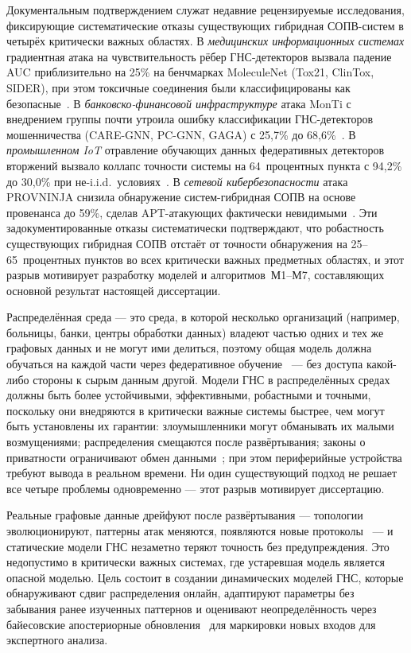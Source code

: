 Документальным подтверждением служат недавние рецензируемые
исследования, фиксирующие систематические отказы существующих
гибридная СОПВ-систем в четырёх критически важных областях. В
\emph{медицинских информационных системах} градиентная атака на
чувствительность рёбер ГНС-детекторов вызвала падение AUC
приблизительно на 25\% на бенчмарках MoleculeNet (Tox21, ClinTox,
SIDER), при этом токсичные соединения были классифицированы как
безопасные~\cite{EdgeSensitivity2025}. В \emph{банковско-финансовой
инфраструктуре} атака MonTi с внедрением группы почти утроила
ошибку классификации ГНС-детекторов мошенничества (CARE-GNN,
PC-GNN, GAGA) с 25{,}7\% до
68{,}6\%~\cite{MonTi2025}. В \emph{промышленном IoT} отравление
обучающих данных федеративных детекторов вторжений вызвало коллапс
точности системы на 64~процентных пункта с 94{,}2\% до 30{,}0\% при
не-i.i.d.\ условиях~\cite{FerragPoisoning2023}. В \emph{сетевой
кибербезопасности} атака PROVNINJA снизила обнаружение
систем-гибридная СОПВ на основе провенанса до 59\%, сделав
APT-атакующих фактически
невидимыми~\cite{PROVNINJA2023}. Эти задокументированные отказы
систематически подтверждают, что робастность существующих
гибридная СОПВ отстаёт от точности обнаружения на 25--65~процентных
пунктов во всех критически важных предметных областях, и этот
разрыв мотивирует разработку моделей и алгоритмов~М1--М7,
составляющих основной результат настоящей диссертации.

Распределённая среда --- это среда, в которой несколько организаций (например, больницы, банки, центры обработки данных) владеют частью одних и тех же графовых данных и не могут ими делиться, поэтому общая модель должна обучаться на каждой части через федеративное обучение~\cite{McMahan2017,Blanchard2017,Kairouz2021,Konecny2016,Mothukuri2021} --- без доступа какой-либо стороны к сырым данным другой. Модели ГНС в распределённых средах должны быть более устойчивыми, эффективными, робастными и точными, поскольку они внедряются в критически важные системы быстрее, чем могут быть установлены их гарантии: злоумышленники могут обманывать их малыми возмущениями; распределения смещаются после развёртывания; законы о приватности ограничивают обмен данными~\cite{Dwork2006,Abadi2016,Dwork2014,Mironov2017}; при этом периферийные устройства требуют вывода в реальном времени. Ни один существующий подход не решает все четыре проблемы одновременно --- этот разрыв мотивирует диссертацию.

Реальные графовые данные дрейфуют после развёртывания --- топологии эволюционируют, паттерны атак меняются, появляются новые протоколы~\cite{Gama2014,Lu2019} --- и статические модели ГНС незаметно теряют точность без предупреждения. Это недопустимо в критически важных системах, где устаревшая модель является опасной моделью. Цель состоит в создании динамических моделей ГНС, которые обнаруживают сдвиг распределения онлайн, адаптируют параметры без забывания ранее изученных паттернов и оценивают неопределённость через байесовские апостериорные обновления~\cite{Gal2016,Kendall2017,Lakshminarayanan2017} для маркировки новых входов для экспертного анализа.

